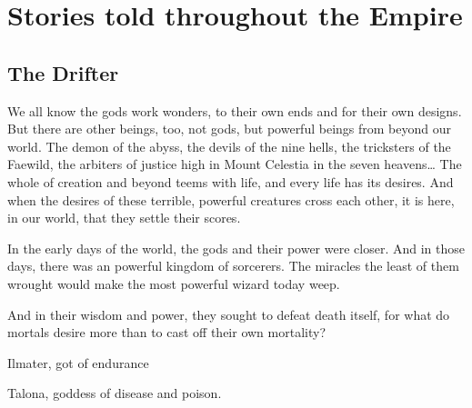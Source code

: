 \section{Stories told throughout the Empire}

\subsection{The Drifter}

We all know the gods work wonders, to their own ends and for their own designs.
But there are other beings, too, not gods, but powerful beings from beyond our world.
The demon of the abyss, the devils of the nine hells,
  the tricksters of the Faewild, the arbiters of justice high in Mount Celestia in the seven heavens\ldots
The whole of creation and beyond teems with life, and every life has its desires.
And when the desires of these terrible, powerful creatures cross each other, it is here,
  in our world, that they settle their scores.

In the early days of the world, the gods and their power were closer.
And in those days, there was an powerful kingdom of sorcerers.
The miracles the least of them wrought would make the most powerful wizard today weep.

And in their wisdom and power, they sought to defeat death itself, for what do mortals desire more
  than to cast off their own mortality?

Ilmater, got of endurance

Talona, goddess of disease and poison.

